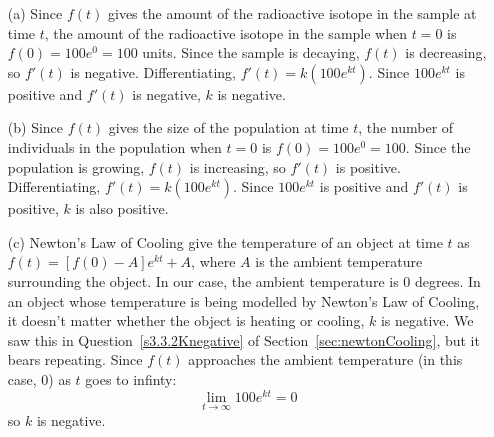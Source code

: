 \begin{solution}
\begin{itemize}
\item[(a)] Since $f(t)$ gives the amount of  the radioactive isotope in the sample at time $t$, the amount of the radioactive isotope in the sample when $t=0$ is $f(0)=100e^0=100$ units. Since the sample is decaying,  $f(t)$ is decreasing, so $f'(t)$ is negative. Differentiating, $f'(t)=k(100e^{kt})$. Since $100e^{kt}$ is positive and $f'(t)$ is negative, $k$ is negative.
\item[(b)] Since $f(t)$ gives the size of the population at time $t$, the number of individuals in the population when $t=0$ is $f(0)=100e^0=100$. Since the population is growing,  $f(t)$ is increasing, so $f'(t)$ is positive. Differentiating, $f'(t)=k(100e^{kt})$. Since $100e^{kt}$ is positive and $f'(t)$ is positive, $k$ is also positive.
\item[(c)] Newton's Law of Cooling give the temperature of an object at time $t$ as
$f(t)=[f(0)-A]e^{kt}+A$, where $A$ is the ambient temperature surrounding the object. In our case, the ambient temperature is 0 degrees. In an object whose temperature is being modelled by Newton's Law of Cooling,  it doesn't matter whether the object is heating or cooling, $k$ is negative. We saw this in Question~\ref{s3.3.2Knegative} of Section~\ref*{sec:newtonCooling}, %
 but it bears repeating. Since $f(t)$ approaches the ambient temperature (in this case, 0) as $t$ goes to infinty:
\[\lim_{t \to \infty}100e^{kt}=0\]
so $k$ is negative.
\end{itemize}
\end{solution}
